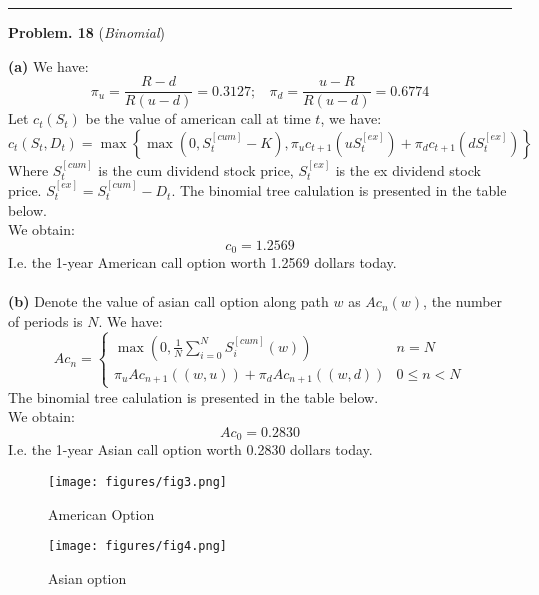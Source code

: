 \documentclass[10 pt]{hwtemplate} %
\begin{document}
\noindent\rule{16cm}{0.4pt}
\textbf{Problem. 18} (\textit{Binomial})\\
\begin{solution} \textbf{(a)} We have:
\begin{equation}
  \pi_u = \frac{R-d}{R(u-d)} = 0.3127;~~~~  \pi_d = \frac{u-R}{R(u-d)} = 0.6774
\end{equation}
Let $c_t(S_t)$ be the value of american call at time $t$, we have:
\begin{equation}
  c_t(S_t, D_t) = \max\left\{\max(0, S_t^{[cum]}-K), \pi_u c_{t+1}(uS_t^{[ex]})+\pi_d c_{t+1}(dS_t^{[ex]})\right\}
\end{equation}
Where $S_t^{[cum]}$ is the cum dividend stock price, $S_t^{[ex]}$ is the ex dividend stock price. $S_t^{[ex]} = S_t^{[cum]} - D_t$. The binomial tree calulation is presented in the table below.\\
We obtain:
$$c_0 = 1.2569$$
I.e. the 1-year American call option worth 1.2569 dollars today.\\
~\\
\textbf{(b)} Denote the value of asian call option along path $w$ as $Ac_n(w)$, the number of periods is $N$. We have:
\begin{equation}
  Ac_n = \begin{cases}
  \max(0, \frac{1}{N}\sum_{i=0}^N S_i^{[cum]}(w)) & n=N\\
  \pi_u Ac_{n+1}((w, u)) + \pi_d Ac_{n+1}((w, d)) & 0\leq n<N
  \end{cases}
\end{equation}
The binomial tree calulation is presented in the table below.\\
We obtain:
$$Ac_0 = 0.2830$$
I.e. the 1-year Asian call option worth 0.2830 dollars today.\\


\begin{figure}[H]
  \centering
  \captionsetup{justification=centering}
  \caption{\label{fig:q18pa}American Option}
  \texttt{[image: figures/fig3.png]}
\end{figure}


\begin{figure}[H]
  \centering
  \captionsetup{justification=centering}
  \caption{\label{fig:q18pb}Asian option}
  \texttt{[image: figures/fig4.png]}
\end{figure}

\end{solution}
\end{document}
